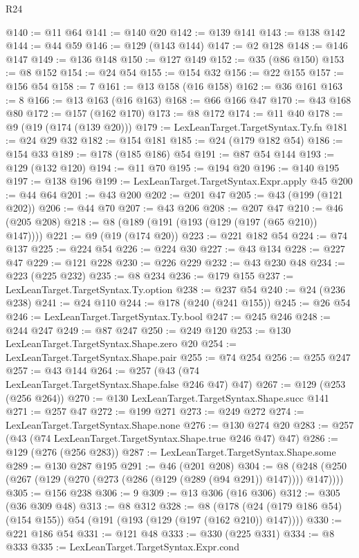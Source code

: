 \begin{lexlean}{R24}
\begin{coremodule}
@140 := @11 @64
@141 := @140 @20
@142 := @139 @141
@143 := @138 @142
@144 := @44 @59
@146 := @129 (@143 @144)
@147 := @2 @128
@148 := @146 @147
@149 := @136 @148
@150 := @127 @149
@152 := @35 (@86 @150)
@153 := @8 @152
@154 := @24 @54
@155 := @154 @32
@156 := @22 @155
@157 := @156 @54
@158 := 7
@161 := @13 @158 (@16 @158)
@162 := @36 @161
@163 := 8
@166 := @13 @163 (@16 @163)
@168 := @66 @166 @47
@170 := @43 @168 @80
@172 := @157 (@162 @170)
@173 := @8 @172
@174 := @11 @40
@178 := @9 (@19 (@174 (@139 @20)))
@179 := LexLeanTarget.TargetSyntax.Ty.fn
@181 := @24 @29 @32
@182 := @154 @181
@185 := @24 (@179 @182 @54)
@186 := @154 @33
@189 := @178 (@185 @186) @54
@191 := @87 @54 @144
@193 := @129 (@132 @120)
@194 := @11 @70
@195 := @194 @20
@196 := @140 @195
@197 := @138 @196
@199 := LexLeanTarget.TargetSyntax.Expr.apply @45
@200 := @44 @64
@201 := @43 @200
@202 := @201 @47
@205 := @43 (@199 (@121 @202))
@206 := @44 @70
@207 := @43 @206
@208 := @207 @47
@210 := @46 (@205 @208)
@218 := @8 (@189 (@191 (@193 (@129 (@197 (@65 @210)) @147))))
@221 := @9 (@19 (@174 @20))
@223 := @221 @182 @54
@224 := @74 @137
@225 := @224 @54
@226 := @224 @30
@227 := @43 @134
@228 := @227 @47
@229 := @121 @228
@230 := @226 @229
@232 := @43 @230 @48
@234 := @223 (@225 @232)
@235 := @8 @234
@236 := @179 @155
@237 := LexLeanTarget.TargetSyntax.Ty.option
@238 := @237 @54
@240 := @24 (@236 @238)
@241 := @24 @110
@244 := @178 (@240 (@241 @155))
@245 := @26 @54
@246 := LexLeanTarget.TargetSyntax.Ty.bool
@247 := @245 @246
@248 := @244 @247
@249 := @87 @247
@250 := @249 @120
@253 := @130 LexLeanTarget.TargetSyntax.Shape.zero @20
@254 := LexLeanTarget.TargetSyntax.Shape.pair
@255 := @74 @254
@256 := @255 @247
@257 := @43 @144
@264 := @257 (@43 (@74 LexLeanTarget.TargetSyntax.Shape.false @246 @47) @47)
@267 := @129 (@253 (@256 @264))
@270 := @130 LexLeanTarget.TargetSyntax.Shape.succ @141
@271 := @257 @47
@272 := @199 @271
@273 := @249 @272
@274 := LexLeanTarget.TargetSyntax.Shape.none
@276 := @130 @274 @20
@283 := @257 (@43 (@74 LexLeanTarget.TargetSyntax.Shape.true @246 @47) @47)
@286 := @129 (@276 (@256 @283))
@287 := LexLeanTarget.TargetSyntax.Shape.some
@289 := @130 @287 @195
@291 := @46 (@201 @208)
@304 := @8 (@248 (@250 (@267 (@129 (@270 (@273 (@286 (@129 (@289 (@94 @291)) @147)))) @147))))
@305 := @156 @238
@306 := 9
@309 := @13 @306 (@16 @306)
@312 := @305 (@36 @309 @48)
@313 := @8 @312
@328 := @8 (@178 (@24 (@179 @186 @54) (@154 @155)) @54 (@191 (@193 (@129 (@197 (@162 @210)) @147))))
@330 := @221 @186 @54
@331 := @121 @48
@333 := @330 (@225 @331)
@334 := @8 @333
@335 := LexLeanTarget.TargetSyntax.Expr.cond

\end{coremodule}
\end{lexlean}
